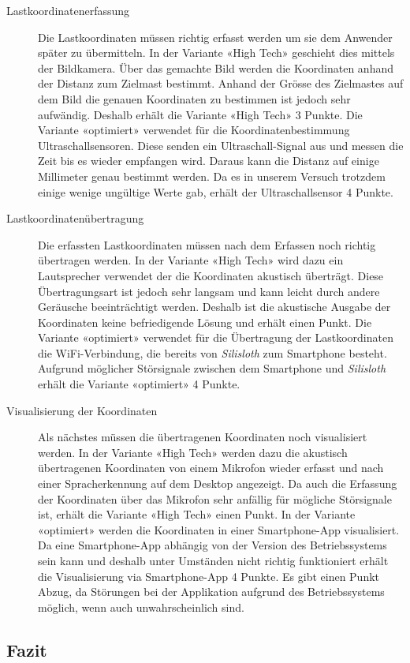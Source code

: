 \documentclass[a4paper,11pt]{scrartcl}
\begin{document}
\begin{description}
    \item [Lastkoordinatenerfassung] Die Lastkoordinaten müssen richtig erfasst werden um sie dem Anwender später zu übermitteln. In der Variante «High Tech» geschieht dies mittels der Bildkamera. Über das gemachte Bild werden die Koordinaten anhand der Distanz zum Zielmast bestimmt. Anhand der Grösse des Zielmastes auf dem Bild die genauen Koordinaten zu bestimmen ist jedoch sehr aufwändig. Deshalb erhält die Variante «High Tech» 3 Punkte. Die Variante «optimiert» verwendet für die Koordinatenbestimmung Ultraschallsensoren. Diese senden ein Ultraschall-Signal aus und messen die Zeit bis es wieder empfangen wird. Daraus kann die Distanz auf einige Millimeter genau bestimmt werden. Da es in unserem Versuch trotzdem einige wenige ungültige Werte gab, erhält der Ultraschallsensor 4 Punkte. 
    \item [Lastkoordinatenübertragung] Die erfassten Lastkoordinaten müssen nach dem Erfassen noch richtig übertragen werden. In der Variante «High Tech» wird dazu ein Lautsprecher verwendet der die Koordinaten akustisch überträgt. Diese Übertragungsart ist jedoch sehr langsam und kann leicht durch andere Geräusche beeinträchtigt werden. Deshalb ist die akustische Ausgabe der Koordinaten keine befriedigende Lösung und erhält einen Punkt. Die Variante «optimiert» verwendet für die Übertragung der Lastkoordinaten die WiFi-Verbindung, die bereits von \textit{Silisloth} zum Smartphone besteht. Aufgrund möglicher Störsignale zwischen dem Smartphone und \textit{Silisloth} erhält die Variante «optimiert» 4 Punkte.
    \item [Visualisierung der Koordinaten] Als nächstes müssen die übertragenen Koordinaten noch visualisiert werden. In der Variante «High Tech» werden dazu die akustisch übertragenen Koordinaten von einem Mikrofon wieder erfasst und nach einer Spracherkennung auf dem Desktop angezeigt. Da auch die Erfassung der Koordinaten über das Mikrofon sehr anfällig für mögliche Störsignale ist, erhält die Variante «High Tech» einen Punkt. In der Variante «optimiert» werden die Koordinaten in einer Smartphone-App visualisiert. Da eine Smartphone-App abhängig von der Version des Betriebssystems sein kann und deshalb unter Umständen nicht richtig funktioniert erhält die Visualisierung via Smartphone-App 4 Punkte. Es gibt einen Punkt Abzug, da Störungen bei der Applikation aufgrund des Betriebssystems möglich, wenn auch unwahrscheinlich sind. 
\end{description}

\subsection{Fazit}
\end{document}
